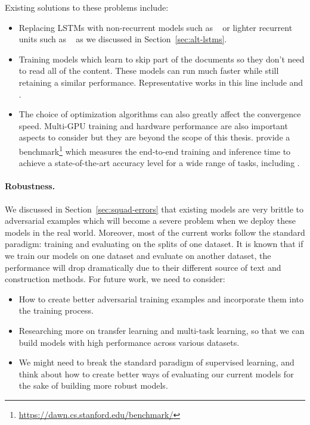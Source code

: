 Existing solutions to these problems include:
\begin{itemize}
    \item
        Replacing LSTMs with non-recurrent models such as ~\cite{vaswani2017attention} or lighter recurrent units such as ~\cite{lei2018simple} as we discussed in Section~\ref{sec:alt-lstms}.
    \item
        Training models which learn to skip part of the documents so they don't need to read all of the content. These models can run much faster while still retaining a similar performance. Representative works in this line include  and .
    \item
        The choice of optimization algorithms can also greatly affect the convergence speed. Multi-GPU training and hardware performance are also important aspects to consider but they are beyond the scope of this thesis.  provide a benchmark\footnote{\href{https://dawn.cs.stanford.edu/benchmark/}{https://dawn.cs.stanford.edu/benchmark/}} which measures the end-to-end training and inference time to achieve a state-of-the-art accuracy level for a wide range of tasks, including .
\end{itemize}


\paragraph{Robustness.} We discussed in Section~\ref{sec:squad-errors} that existing models are very brittle to adversarial examples which will become a severe problem when we deploy these models in the real world. Moreover, most of the current works follow the standard paradigm: training and evaluating on the splits of one dataset. It is known that if we train our models on one dataset and evaluate on another dataset, the performance will drop dramatically due to their different source of text and construction methods. For future work, we need to consider:
\begin{itemize}
    \item How to create better adversarial training examples and incorporate them into the training process.
    \item Researching more on transfer learning and multi-task learning, so that we can build models with high performance across various datasets.
    \item We might need to break the standard paradigm of supervised learning, and think about how to create better ways of evaluating our current models for the sake of building more robust models.
\end{itemize}

